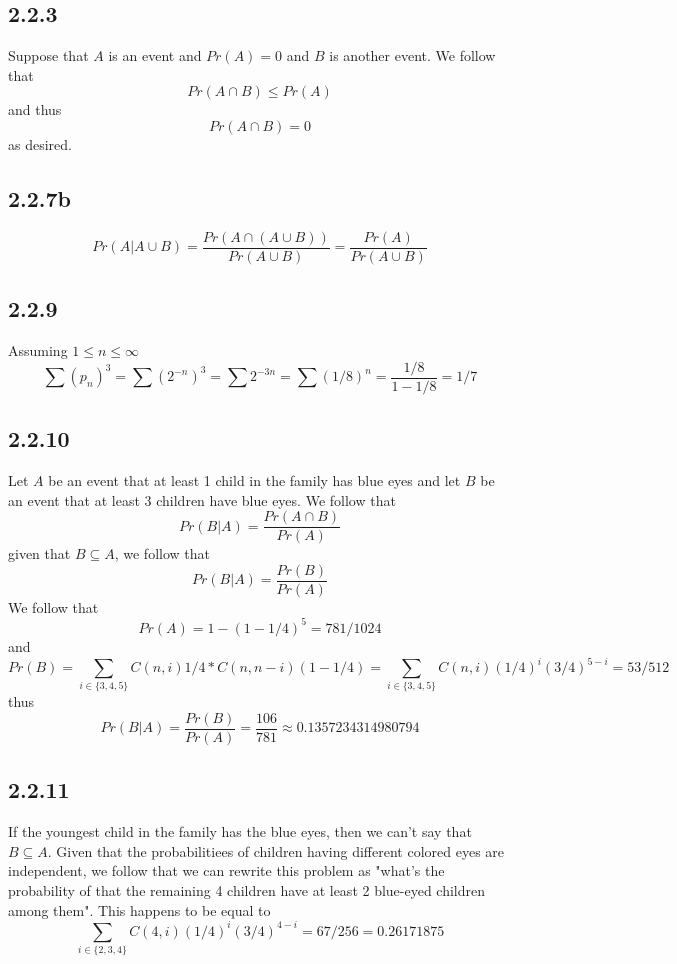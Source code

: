 \documentclass[11pt,oneside,titlepage]{book}
\newcommand{\set}[1]{\{ #1 \}}
\begin{document}
\subsection*{2.2.3}

Suppose that $A$ is an event and $Pr(A) = 0$ and $B$ is another event.
We follow that
$$Pr(A \cap B) \leq Pr(A)$$
and thus
$$Pr(A \cap B) = 0$$
as desired.

\subsection*{2.2.7b}

$$Pr(A|A \cup B) = \frac{Pr(A \cap (A \cup B))}{Pr(A \cup B)} =
\frac{Pr(A)}{Pr(A \cup B)} $$

\subsection*{2.2.9}

Assuming $1 \leq n \leq \infty$
$$\sum{(p_n)^3} = \sum{(2^{-n})^3} = \sum{2^{-3n}} = \sum{(1/8)^{n}} = \frac{1/8}{1 - 1/8} = 1/7$$

\subsection*{2.2.10}

Let $A$ be an event that at least 1 child in the family has blue eyes and
let $B$ be an event that at least 3 children have blue eyes. We follow that
$$Pr(B|A) = \frac{Pr(A \cap B)}{Pr(A)}$$
given that $B \subseteq A$, we follow that
$$Pr(B|A) = \frac{Pr(B)}{Pr(A)}$$
We follow that
$$Pr(A) = 1 - (1 - 1/4)^5 = 781/1024$$
and
$$Pr(B) = \sum_{i \in \set{3, 4, 5}}{C(n, i)1/4 * C(n, n - i)(1 - 1/4)} =
\sum_{i \in \set{3, 4, 5}}{C(n, i)(1/4)^i(3/4)^{5 - i}} = 53/512
$$
thus
$$Pr(B|A) = \frac{Pr(B)}{Pr(A)} = \frac{106}{781} \approx 0.1357234314980794$$

\subsection*{2.2.11}

If the youngest child in the family has the blue eyes, then we can't say that $B \subseteq A$.
Given that the probabilitiees of children having different colored eyes are independent,
we follow that we can rewrite this problem as "what's the probability of that the
remaining 4 children have at least 2 blue-eyed children among them". This happens to be equal to
$$\sum_{i \in \set{2, 3, 4}}{C(4, i)(1/4)^i(3/4)^{4 - i}} = 67/256 = 0.26171875$$
\end{document}
